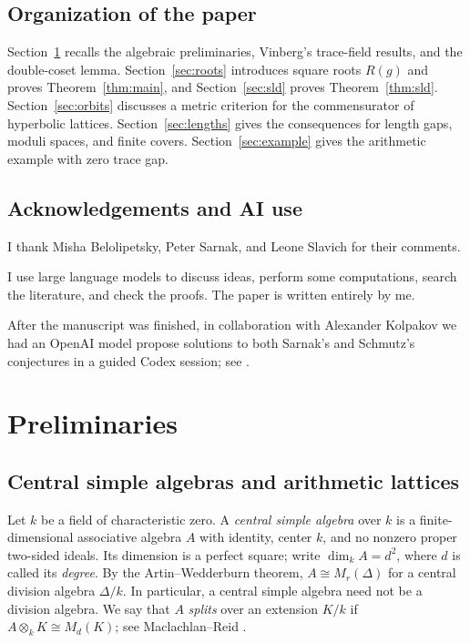 \documentclass[reqno]{amsart}
\theoremstyle{remark}
\begin{document}
\subsection*{Organization of the paper} Section~\ref{sec:prelim} recalls the algebraic preliminaries, Vinberg's trace-field results, and the double-coset lemma. Section~\ref{sec:roots} introduces square roots $R(g)$ and proves Theorem~\ref{thm:main}, and Section~\ref{sec:sld} proves Theorem~\ref{thm:sld}. Section~\ref{sec:orbits} discusses a metric criterion for the commensurator of hyperbolic lattices. Section~\ref{sec:lengths} gives the consequences for length gaps, moduli spaces, and finite covers. Section~\ref{sec:example} gives the arithmetic example with zero trace gap.

\subsection*{Acknowledgements and AI use} I thank Misha Belolipetsky, Peter Sarnak, and Leone Slavich for their comments.

I use large language models to discuss ideas, perform some computations, search the literature, and check the proofs. The paper is written entirely by me.

After the manuscript was finished, in collaboration with Alexander Kolpakov we had an OpenAI model propose solutions to both Sarnak's and Schmutz's conjectures in a guided Codex session; see \cite{TraceSparsityManuscript}.

\section{Preliminaries}\label{sec:prelim}

\subsection{Central simple algebras and arithmetic lattices}\label{subsec:algebras}

Let $k$ be a field of characteristic zero. A \emph{central simple algebra} over $k$ is a finite-dimensional associative algebra $A$ with identity, center $k$, and no nonzero proper two-sided ideals. Its dimension is a perfect square; write $\dim_k A=d^2$, where $d$ is called its \emph{degree}. By the Artin--Wedderburn theorem, $A\cong M_r(\Delta)$ for a central division algebra $\Delta/k$. In particular, a central simple algebra need not be a division algebra. We say that $A$ \emph{splits} over an extension $K/k$ if $A\otimes_k K\cong M_d(K)$; see Maclachlan--Reid \cite[\S2.8]{MaclachlanReid}.
\end{document}
